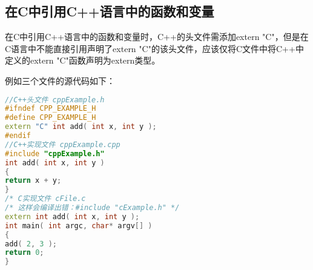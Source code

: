 \subsection{在C中引用C++语言中的函数和变量}
在C中引用C++语言中的函数和变量时，C++的头文件需添加extern "C"，但是在C语言中不能直接引用声明了extern "C"的该头文件，应该仅将C文件中将C++中定义的extern "C"函数声明为extern类型。

例如三个文件的源代码如下：
\begin{lstlisting}[language=C++]
 //C++头文件 cppExample.h
#ifndef CPP_EXAMPLE_H
#define CPP_EXAMPLE_H
extern "C" int add( int x, int y );
#endif
//C++实现文件 cppExample.cpp
#include "cppExample.h"
int add( int x, int y )
{
return x + y;
}
/* C实现文件 cFile.c
/* 这样会编译出错：#include "cExample.h" */
extern int add( int x, int y );
int main( int argc, char* argv[] )
{
add( 2, 3 ); 
return 0;
}
\end{lstlisting} 

